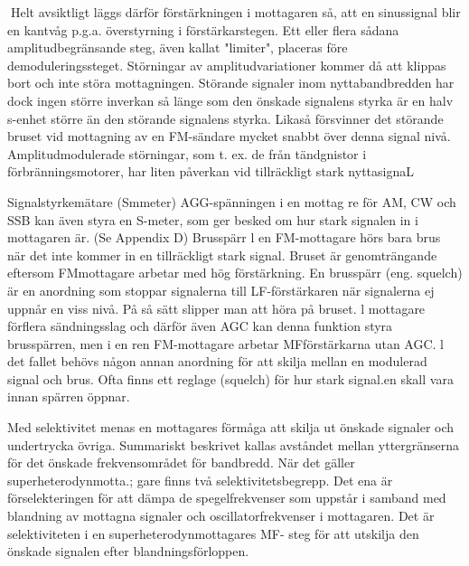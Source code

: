 \documentclass[a4paper,twoside,twocolumn,openright]{book}
\begin{document}
{{{Helt avsiktligt läggs därför förstärkningen i
mottagaren så, att en sinussignal blir en
kantvåg p.g.a. överstyrning i förstärkarstegen. Ett eller flera sådana amplitudbegränsande steg, även kallat "limiter", placeras
före demoduleringssteget. Störningar av
amplitudvariationer kommer då att klippas
bort och inte störa mottagningen.
Störande signaler inom nyttabandbredden har dock ingen större inverkan så länge
som den önskade signalens styrka är en
halv s-enhet större än den störande signalens styrka. Likaså försvinner det störande
bruset vid mottagning av en FM-sändare
mycket snabbt över denna signal nivå. Amplitudmodulerade störningar, som t. ex. de från
tändgnistor i förbränningsmotorer, har liten
påverkan vid tillräckligt stark nyttasignaL

Signalstyrkemätare (Smmeter)
AGG-spänningen i en mottag re för AM, CW
och SSB kan även styra en S-meter, som
ger besked om hur stark signalen in i mottagaren är. (Se Appendix D)
Brusspärr
l en FM-mottagare hörs bara brus när det
inte kommer in en tillräckligt stark signal.
Bruset är genomträngande eftersom FMmottagare arbetar med hög förstärkning. En
brusspärr (eng. squelch) är en anordning
som stoppar signalerna till LF-förstärkaren
när signalerna ej uppnår en viss nivå. På så
sätt slipper man att höra på bruset. l mottagare förflera sändningsslag och därför även
AGC kan denna funktion styra brusspärren,
men i en ren FM-mottagare arbetar MFförstärkarna utan AGC. l det fallet behövs
någon annan anordning för att skilja mellan
en modulerad signal och brus. Ofta finns ett
reglage (squelch) för hur stark signal.en
skall vara innan spärren öppnar.

Med selektivitet menas en mottagares förmåga att skilja ut önskade signaler och
undertrycka övriga. Summariskt beskrivet
kallas avståndet mellan yttergränserna för
det önskade frekvensområdet för bandbredd. När det gäller superheterodynmotta.;
gare finns två selektivitetsbegrepp.
Det ena är förselekteringen för att dämpa
de spegelfrekvenser som uppstår i samband med blandning av mottagna signaler
och oscillatorfrekvenser i mottagaren.
Det är selektiviteten i en superheterodynmottagares MF- steg för att utskilja den
önskade signalen efter blandningsförloppen.

}}}
\end{document}
